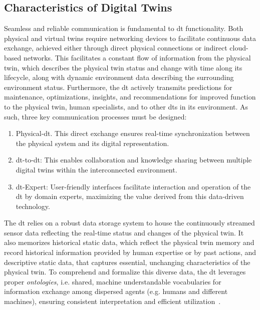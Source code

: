 \iffalse
    \subsection{Characteristics of Digital Twins}

    Seamless and reliable communication is fundamental to \acrshort{dt} functionality. Both physical and virtual twins require networking devices to facilitate continuous data exchange, achieved either through direct physical connections or indirect cloud-based networks. This facilitates a constant flow of information from the physical twin, which describes the physical twin status and change with time along its lifecycle, along with dynamic environment data describing the surrounding environment status. Furthermore, the \acrshort{dt} actively transmits predictions for maintenance, optimizations, insights, and recommendations for improved function to the physical twin, human specialists, and to other \acrshort{dt}s in its environment. As such, three key communication processes must be designed:

    \begin{enumerate}
        \item Physical-\acrshort{dt}. This direct exchange ensures real-time synchronization between the physical system and its digital representation.
        \item \acrshort{dt}-to-\acrshort{dt}: This enables collaboration and knowledge sharing between multiple digital twins within the interconnected environment.
        \item \acrshort{dt}-Expert: User-friendly interfaces facilitate interaction and operation of the \acrshort{dt} by domain experts, maximizing the value derived from this data-driven technology.
    \end{enumerate}

    The \acrshort{dt} relies on a robust data storage system to house the continuously streamed sensor data reflecting the real-time status and changes of the physical twin.
    It also memorizes historical static data, which reflect the physical twin memory and record historical information provided by human expertise or by past actions, and descriptive static data, that captures essential, unchanging characteristics of the physical twin. To comprehend and formalize this diverse data, the \acrshort{dt} leverages proper \textit{ontologies}, i.e. shared, machine understandable vocabularies for information exchange among dispersed agents (e.g. humans and different machines), ensuring consistent interpretation and efficient utilization~\parencite{negriReviewRolesDigital2017}.

